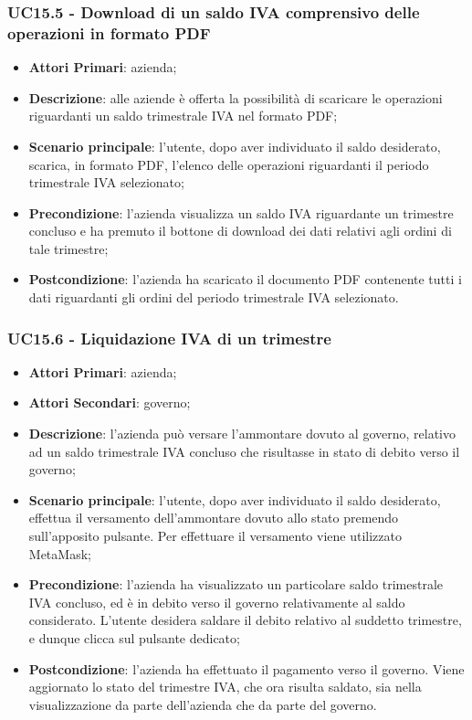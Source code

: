 \subsubsection{UC15.5 - Download di un saldo IVA comprensivo delle operazioni in formato PDF}
\begin{itemize}
	\item \textbf{Attori Primari}: azienda;
	\item \textbf{Descrizione}: alle aziende è offerta la possibilità di scaricare le operazioni riguardanti un saldo trimestrale IVA nel formato PDF;
	\item \textbf{Scenario principale}: l'utente, dopo aver individuato il saldo desiderato, scarica, in formato PDF, l'elenco delle operazioni riguardanti il periodo trimestrale IVA selezionato;
	\item \textbf{Precondizione}: l'azienda visualizza un saldo IVA riguardante un trimestre concluso e ha premuto il bottone di download dei dati relativi agli ordini di tale trimestre;
	\item \textbf{Postcondizione}: l'azienda ha scaricato il documento PDF contenente tutti i dati riguardanti gli ordini del periodo trimestrale IVA selezionato.
\end{itemize} 

\subsubsection{UC15.6 - Liquidazione IVA di un trimestre}
\begin{itemize}
	\item \textbf{Attori Primari}: azienda;
	\item \textbf{Attori Secondari}: governo;
	\item \textbf{Descrizione}: l'azienda può versare l'ammontare dovuto al governo, relativo ad un saldo trimestrale IVA concluso che risultasse in stato di debito verso il governo;
	\item \textbf{Scenario principale}: l'utente, dopo aver individuato il saldo desiderato, effettua il versamento dell'ammontare dovuto allo stato premendo sull'apposito pulsante. Per effettuare il versamento viene utilizzato MetaMask\glo;
	\item \textbf{Precondizione}: l'azienda ha visualizzato un particolare saldo trimestrale IVA concluso, ed è in debito verso il governo relativamente al saldo considerato. L'utente desidera saldare il debito relativo al suddetto trimestre, e dunque clicca sul pulsante dedicato;
	\item \textbf{Postcondizione}: l'azienda ha effettuato il pagamento verso il governo. Viene aggiornato lo stato del trimestre IVA, che ora risulta saldato, sia nella visualizzazione da parte dell'azienda che da parte del governo.
\end{itemize} 

